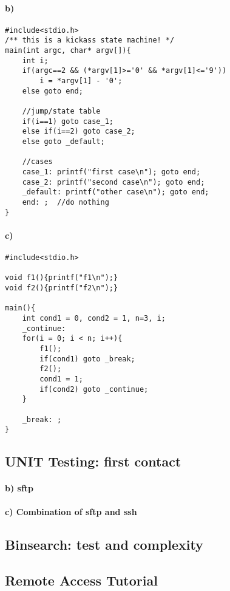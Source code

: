 \documentclass[12pt]{article}
\begin{document}
\paragraph*{b)} \quad
\begin{lstlisting}
#include<stdio.h>
/** this is a kickass state machine! */
main(int argc, char* argv[]){
	int i;
	if(argc==2 && (*argv[1]>='0' && *argv[1]<='9'))
		i = *argv[1] - '0';
	else goto end; 

	//jump/state table
	if(i==1) goto case_1;
	else if(i==2) goto case_2;
	else goto _default;	

	//cases
	case_1: printf("first case\n"); goto end;
	case_2: printf("second case\n"); goto end;
	_default: printf("other case\n"); goto end;
	end: ;  //do nothing
}
\end{lstlisting}

\paragraph*{c)}
\quad
\begin{lstlisting}
#include<stdio.h>

void f1(){printf("f1\n");}
void f2(){printf("f2\n");}

main(){
	int cond1 = 0, cond2 = 1, n=3, i;
	_continue:
	for(i = 0; i < n; i++){
		f1();
		if(cond1) goto _break;
		f2();
		cond1 = 1;		
		if(cond2) goto _continue;
	}
	
	_break: ;
}
\end{lstlisting}

\subsection*{UNIT Testing: first contact}



\paragraph*{b) sftp}

\paragraph*{c) Combination of sftp and ssh}


\subsection*{Binsearch: test and complexity}
\newpage
\subsection*{Remote Access Tutorial}
\end{document}
